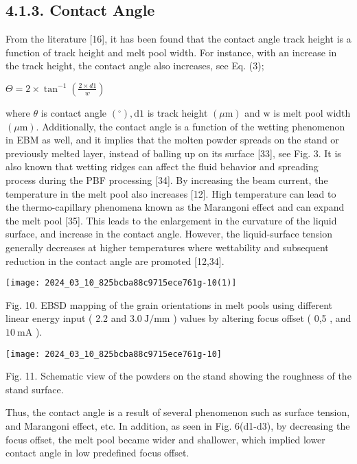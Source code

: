 \documentclass[10pt]{article}
\begin{document}
\subsection*{4.1.3. Contact Angle}
From the literature [16], it has been found that the contact angle track height is a function of track height and melt pool width. For instance, with an increase in the track height, the contact angle also increases, see Eq. (3);

$\Theta=2 \times \tan ^{-1}\left(\frac{2 \times d 1}{w}\right)$

where $\theta$ is contact angle $\left({ }^{\circ}\right), \mathrm{d} 1$ is track height $(\mu \mathrm{m})$ and $\mathrm{w}$ is melt pool width $(\mu \mathrm{m})$. Additionally, the contact angle is a function of the wetting phenomenon in EBM as well, and it implies that the molten powder spreads on the stand or previously melted layer, instead of balling up on its surface [33], see Fig. 3. It is also known that wetting ridges can affect the fluid behavior and spreading process during the PBF processing [34]. By increasing the beam current, the temperature in the melt pool also increases [12]. High temperature can lead to the thermo-capillary phenomena known as the Marangoni effect and can expand the melt pool [35]. This leads to the enlargement in the curvature of the liquid surface, and increase in the contact angle. However, the liquid-surface tension generally decreases at higher temperatures where wettability and subsequent reduction in the contact angle are promoted [12,34].

\begin{center}
\texttt{[image: 2024\_03\_10\_825bcba88c9715ece761g-10(1)]}
\end{center}

Fig. 10. EBSD mapping of the grain orientations in melt pools using different linear energy input ( 2.2 and $3.0 \mathrm{~J} / \mathrm{mm}$ ) values by altering focus offset ( 0,5 , and $10 \mathrm{~mA}$ ).

\begin{center}
\texttt{[image: 2024\_03\_10\_825bcba88c9715ece761g-10]}
\end{center}

Fig. 11. Schematic view of the powders on the stand showing the roughness of the stand surface.

Thus, the contact angle is a result of several phenomenon such as surface tension, and Marangoni effect, etc. In addition, as seen in Fig. 6(d1-d3), by decreasing the focus offset, the melt pool became wider and shallower, which implied lower contact angle in low predefined focus offset.
\end{document}
